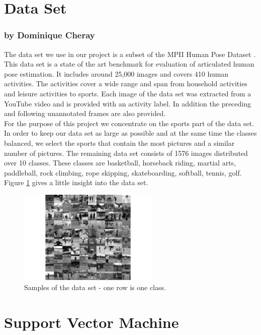 \documentclass[11pt]{report}
\begin{document}
\section{Data Set}
\label{dataset}
\subsubsection{by Dominique Cheray}
The data set we use in our project is a subset of the MPII Human Pose Dataset
\cite{andriluka20142d}. This data set is a state of the art benchmark for
evaluation of articulated human pose estimation. It includes around
25,000 images and covers 410 human activities. The activities cover a wide range
and span from household activities and leisure activities to sports. Each image
of the data set was extracted from a YouTube video and is provided with an
activity label. In addition the preceding and following unannotated frames are
also provided. \\
For the purpose of this project we concentrate on the sports part of the
data set. In order to keep our data set as large as possible and at the same
time the classes balanced, we select the sports that contain the most
pictures and a similar number of pictures. The remaining data set consists of
1576 images distributed over 10 classes. These classes are basketball, horseback
riding, martial arts, paddleball, rock climbing, rope skipping, skateboarding,
softball, tennis, golf. Figure \ref{plotgrid} gives a little insight into the
data set. 
\begin{figure}
  \centering
  \includegraphics[width=0.6\textwidth]{plotgrid}
  \caption{Samples of the data set - one row is one class.}
  \label{plotgrid}
\end{figure}

\section {Support Vector Machine}
\label{SVM}
\end{document}
